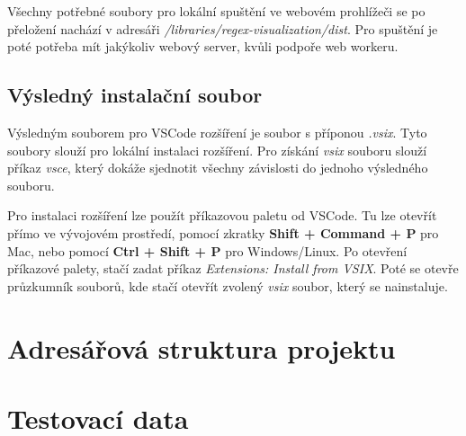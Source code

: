 \documentclass[czech,bachelor]{diploma}
\begin{document}
Všechny potřebné soubory pro lokální spuštění ve webovém prohlížeči se po přeložení nachází v adresáři \textit{/libraries/regex-visualization/dist}. 
Pro spuštění je poté potřeba mít jakýkoliv webový server, kvůli podpoře web workeru.

\section*{Výsledný instalační soubor}

Výsledným souborem pro VSCode rozšíření je soubor s příponou \textit{.vsix}.
Tyto soubory slouží pro lokální instalaci rozšíření.
Pro získání \textit{vsix} souboru slouží příkaz \textit{vsce}, který dokáže sjednotit všechny závislosti do jednoho výsledného souboru.

Pro instalaci rozšíření lze použít příkazovou paletu od VSCode.
Tu lze otevřít přímo ve vývojovém prostředí, pomocí zkratky \textbf{Shift + Command + P} pro Mac, nebo pomocí \textbf{Ctrl + Shift + P} pro Windows/Linux.
Po otevření příkazové palety, stačí zadat příkaz \textit{Extensions: Install from VSIX}.
Poté se otevře průzkumník souborů, kde stačí otevřít zvolený \textit{vsix} soubor, který se nainstaluje.

\chapter{Adresářová struktura projektu}\label{sec:FileStructure}


\chapter{Testovací data}\label{sec:TestingData}
\end{document}
